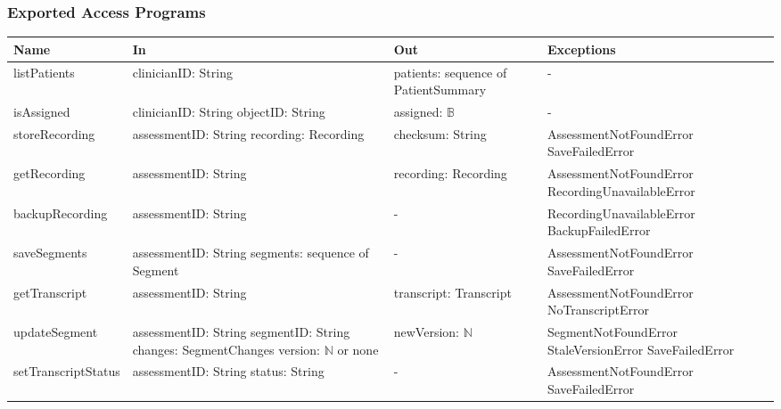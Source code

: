\documentclass[12pt, titlepage]{article}
\begin{document}
\subsubsection{Exported Access Programs}
{\small
\begin{longtable}{>{\raggedright\arraybackslash}p{3.4cm} >{\raggedright\arraybackslash}p{4.3cm} >{\raggedright\arraybackslash}p{3.2cm} >{\raggedright\arraybackslash}p{4.3cm}}
\hline
\textbf{Name} & \textbf{In} & \textbf{Out} & \textbf{Exceptions} \\
\hline
\endhead
listPatients & clinicianID: String & patients: sequence of PatientSummary & - \\[4pt]
isAssigned & clinicianID: String \newline objectID: String & assigned: $\mathbb{B}$ & - \\[4pt]
storeRecording & assessmentID: String \newline recording: Recording & checksum: String & AssessmentNotFoundError \newline SaveFailedError \\[4pt]
getRecording & assessmentID: String & recording: Recording & AssessmentNotFoundError \newline RecordingUnavailableError \\[4pt]
backupRecording & assessmentID: String & - & RecordingUnavailableError \newline BackupFailedError \\[4pt]
saveSegments & assessmentID: String \newline segments: sequence of Segment & - & AssessmentNotFoundError \newline SaveFailedError \\[4pt]
getTranscript & assessmentID: String & transcript: Transcript & AssessmentNotFoundError \newline NoTranscriptError \\[4pt]
updateSegment & assessmentID: String \newline segmentID: String \newline changes: SegmentChanges \newline version: $\mathbb{N}$ or none & newVersion: $\mathbb{N}$ & SegmentNotFoundError \newline StaleVersionError \newline SaveFailedError \\[4pt]
setTranscriptStatus & assessmentID: String \newline status: String & - & AssessmentNotFoundError \newline SaveFailedError \\[4pt]

\end{longtable}}
\end{document}
